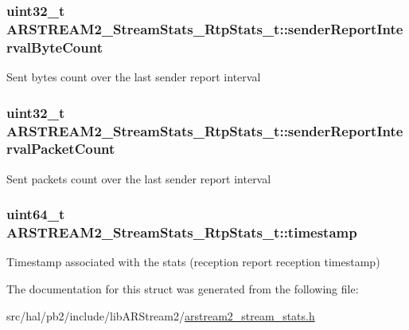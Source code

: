 \subsubsection[{\texorpdfstring{sender\+Report\+Interval\+Byte\+Count}{senderReportIntervalByteCount}}]{\setlength{\rightskip}{0pt plus 5cm}uint32\+\_\+t A\+R\+S\+T\+R\+E\+A\+M2\+\_\+\+Stream\+Stats\+\_\+\+Rtp\+Stats\+\_\+t\+::sender\+Report\+Interval\+Byte\+Count}\hypertarget{struct_a_r_s_t_r_e_a_m2___stream_stats___rtp_stats__t_a5662186a803ccdc648929b5e4380a5ca}{}\label{struct_a_r_s_t_r_e_a_m2___stream_stats___rtp_stats__t_a5662186a803ccdc648929b5e4380a5ca}
Sent bytes count over the last sender report interval 
\subsubsection[{\texorpdfstring{sender\+Report\+Interval\+Packet\+Count}{senderReportIntervalPacketCount}}]{\setlength{\rightskip}{0pt plus 5cm}uint32\+\_\+t A\+R\+S\+T\+R\+E\+A\+M2\+\_\+\+Stream\+Stats\+\_\+\+Rtp\+Stats\+\_\+t\+::sender\+Report\+Interval\+Packet\+Count}\hypertarget{struct_a_r_s_t_r_e_a_m2___stream_stats___rtp_stats__t_a2e91777ab7d26ce357bc5dc3a81ef883}{}\label{struct_a_r_s_t_r_e_a_m2___stream_stats___rtp_stats__t_a2e91777ab7d26ce357bc5dc3a81ef883}
Sent packets count over the last sender report interval 
\subsubsection[{\texorpdfstring{timestamp}{timestamp}}]{\setlength{\rightskip}{0pt plus 5cm}uint64\+\_\+t A\+R\+S\+T\+R\+E\+A\+M2\+\_\+\+Stream\+Stats\+\_\+\+Rtp\+Stats\+\_\+t\+::timestamp}\hypertarget{struct_a_r_s_t_r_e_a_m2___stream_stats___rtp_stats__t_ad704259617663b532001453d8ea15d0d}{}\label{struct_a_r_s_t_r_e_a_m2___stream_stats___rtp_stats__t_ad704259617663b532001453d8ea15d0d}
Timestamp associated with the stats (reception report reception timestamp) 

The documentation for this struct was generated from the following file\+:\begin{DoxyCompactItemize}
\item 
src/hal/pb2/include/lib\+A\+R\+Stream2/\hyperlink{arstream2__stream__stats_8h}{arstream2\+\_\+stream\+\_\+stats.\+h}\end{DoxyCompactItemize}
